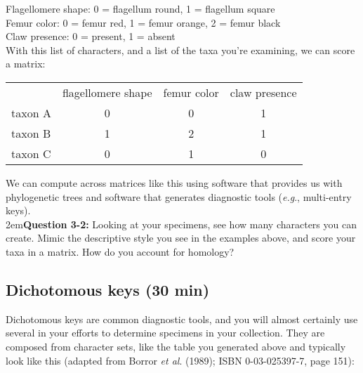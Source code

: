 \documentclass[letterpaper, 11pt]{article}
\begin{document}
Flagellomere shape:	0 = flagellum round, 1 = flagellum square\\

Femur color: 0 = femur red, 1 = femur orange, 2 = femur black\\

Claw presence: 0 = present, 1 = absent\\

With this list of characters, and a list of the taxa you're examining, we can score a matrix:
\begin{table}[H]
\centering
\label{my-label}
\begin{tabular}{lccc}
                             & \multicolumn{1}{l}{flagellomere shape} & \multicolumn{1}{l}{femur color} & \multicolumn{1}{l}{claw presence} \\ \cline{2-4} 
\multicolumn{1}{l|}{taxon A} & \multicolumn{1}{c|}{0}                 & \multicolumn{1}{c|}{0}          & \multicolumn{1}{c|}{1}            \\ \cline{2-4} 
\multicolumn{1}{l|}{taxon B} & \multicolumn{1}{c|}{1}                 & \multicolumn{1}{c|}{2}          & \multicolumn{1}{c|}{1}            \\ \cline{2-4} 
\multicolumn{1}{l|}{taxon C} & \multicolumn{1}{c|}{0}                 & \multicolumn{1}{c|}{1}          & \multicolumn{1}{c|}{0}            \\ \cline{2-4} 
\end{tabular}
\end{table}

\noindent{}We can compute across matrices like this using software that provides us with phylogenetic trees and software that generates diagnostic tools (\textit{e.g}., multi-entry keys).\\

\hangindent2em\textbf{Question 3-2:} Looking at your specimens, see how many characters you can create. Mimic the descriptive style you see in the examples above, and score your taxa in a matrix. How do you account for homology?\\

\subsection{Dichotomous keys (30 min)}
Dichotomous keys are common diagnostic tools, and you will almost certainly use several in your efforts to determine specimens in your collection. They are composed from character sets, like the table you generated above and typically look like this (adapted from Borror \textit{et al}. (1989); ISBN 0-03-025397-7, page 151):\\
\end{document}
